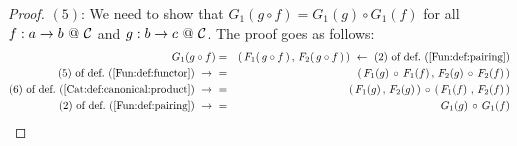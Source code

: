 \begin{proof}
    $(5)$: We need to show that $G_{1}(g\circ f)=G_{1}(g)\circ G_{1}(f)$ 
    for all $f:a\to b\ @\ \mbox{$\cal C$}$ and $g:b\to c\ @\ \mbox{$\cal C$}$. The proof goes
    as follows:
        \begin{eqnarray*}G_{1}(g\circ f)
            &=&(\,F_{1}(\,g\circ f\,)\,,\,F_{2}(\,g\circ f\,)\,)\ \leftarrow\ 
            \mbox{$(2)$ of def.~(\ref{Fun:def:pairing})}\\
            \mbox{$(5)$ of def.~(\ref{Fun:def:functor})}\ \to\ 
            &=&(\,F_{1}(g)\,\circ\, F_{1}(f)\,,\,F_{2}(g)\,
                \circ\, F_{2}(f)\,)\\
            \mbox{$(6)$ of def.~(\ref{Cat:def:canonical:product})}\ \to\ 
            &=&(\,F_{1}(g)\,,\,F_{2}(g)\,)\,\circ\,(\,F_{1}(f)\,
                \,,\,F_{2}(f)\,)\\
            \mbox{$(2)$ of def.~(\ref{Fun:def:pairing})}\ \to\ 
            &=&G_{1}(g)\,\circ\,G_{1}(f)
        \end{eqnarray*}
\end{proof}

